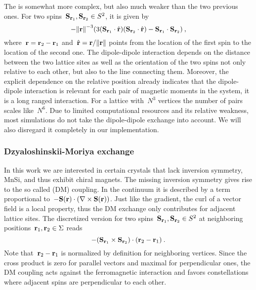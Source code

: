 The  is somewhat more complex, but also much
weaker than the two previous ones. For two spins~$\mathbf{S}_{\mathbf{r}_1}, \mathbf{S}_{\mathbf{r}_2} \in S^2$,
it is given by
%
\begin{equation}
  - {\norm{\r}^{-3}} (3 (\S_{\r_1} \cdot \hat{\r})
  (\S_{\r_2} \cdot \hat{\r}) - \S_{\r_1} \cdot \S_{\r_2})\:,
\end{equation}
%
where~$\mathbf{r} = \mathbf{r}_2 - \mathbf{r}_1$ and~$\hat{\r} = \r / \norm{\r}$ points from the
location of the first spin to the location of the second one. The dipole-dipole
interaction depends on the distance between the two lattice sites as well as the
orientation of the two spins not only relative to each other, but also to the
line connecting them. Moreover, the explicit dependence on the relative position
already indicates that the dipole-dipole interaction is relevant for each pair
of magnetic moments in the system, it is a long ranged interaction. For a
lattice with~$N^3$ vertices the number of pairs scales like~$N^6$. Due to
limited computational resources and its relative weakness, most simulations do
not take the dipole-dipole exchange into account. We will also disregard it
completely in our implementation.

\subsubsection{Dzyaloshinskii-Moriya exchange}

In this work we are interested in certain crystals that lack inversion symmetry,
\eg{} MnSi, and thus exhibit chiral magnets. The missing inversion symmetry
gives rise to the so called  (DM) coupling.
In the continuum it is described by a term proportional to~$-\mathbf{S}(\mathbf{r}) \cdot
(\nabla \times \mathbf{S}(\mathbf{r}))$. Just like the gradient, the curl of a vector field is a
local property, thus the DM exchange only contributes for adjacent lattice
sites. The discretized version for two spins~$\mathbf{S}_{\mathbf{r}_1}, \mathbf{S}_{\mathbf{r}_2} \in S^2$ at
neighboring positions~$\mathbf{r}_1, \mathbf{r}_2 \in \Sigma$ reads
\begin{equation}
  - (\mathbf{S}_{\mathbf{r}_1} \times \mathbf{S}_{\mathbf{r}_2}) \cdot (\mathbf{r}_2 - \mathbf{r}_1)\:.
\end{equation}
%
Note that~$\mathbf{r}_2 - \mathbf{r}_1$ is normalized by definition for neighboring vertices.
Since the cross product is zero for parallel vectors and maximal for
perpendicular ones, the DM coupling acts against the ferromagnetic interaction
and favors constellations where adjacent spins are perpendicular to each other.
%
